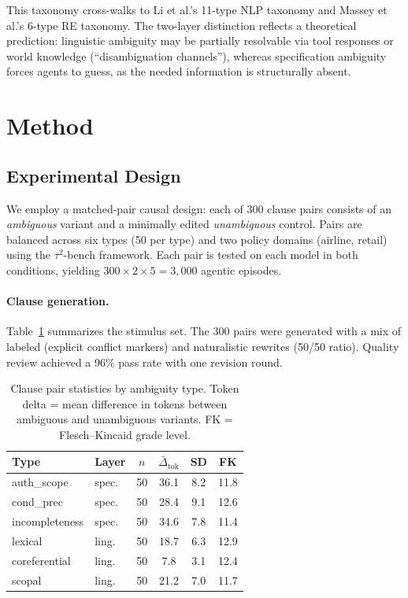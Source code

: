 \documentclass[11pt,a4paper]{article}
\begin{document}
This taxonomy cross-walks to Li et al.'s 11-type NLP taxonomy and Massey et al.'s 6-type RE taxonomy.
The two-layer distinction reflects a theoretical prediction: linguistic ambiguity may be partially resolvable via tool responses or world knowledge (``disambiguation channels''), whereas specification ambiguity forces agents to guess, as the needed information is structurally absent.

\section{Method}
\label{sec:method}

\subsection{Experimental Design}

We employ a matched-pair causal design: each of 300 clause pairs consists of an \emph{ambiguous} variant and a minimally edited \emph{unambiguous} control.
Pairs are balanced across six types (50 per type) and two policy domains (airline, retail) using the $\tau^2$-bench framework.
Each pair is tested on each model in both conditions, yielding $300 \times 2 \times 5 = 3{,}000$ agentic episodes.

\paragraph{Clause generation.}
Table~\ref{tab:clause_stats} summarizes the stimulus set.
The 300 pairs were generated with a mix of labeled (explicit conflict markers) and naturalistic rewrites (50/50 ratio).
Quality review achieved a 96\% pass rate with one revision round.

\begin{table}[t]
\centering
\small
\caption{Clause pair statistics by ambiguity type. Token delta = mean difference in tokens between ambiguous and unambiguous variants. FK = Flesch--Kincaid grade level.}
\label{tab:clause_stats}
\begin{tabular}{llcccc}
\toprule
\textbf{Type} & \textbf{Layer} & \textbf{$n$} & \textbf{$\bar\Delta_\text{tok}$} & \textbf{SD} & \textbf{FK} \\
\midrule
auth\_scope     & spec.  & 50 & 36.1 & 8.2  & 11.8 \\
cond\_prec      & spec.  & 50 & 28.4 & 9.1  & 12.6 \\
incompleteness  & spec.  & 50 & 34.6 & 7.8  & 11.4 \\
lexical         & ling.  & 50 & 18.7 & 6.3  & 12.9 \\
coreferential   & ling.  & 50 &  7.8 & 3.1  & 12.4 \\
scopal          & ling.  & 50 & 21.2 & 7.0  & 11.7 \\
\bottomrule
\end{tabular}
\end{table}
\end{document}
